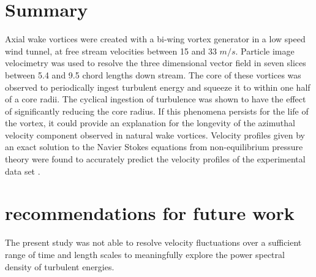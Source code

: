
\section{Summary}

Axial wake vortices were created with a bi-wing vortex generator in a low speed 
wind tunnel, at free stream velocities between 15 and 33 $m/s$. Particle image 
velocimetry was used to resolve the three dimensional vector field in seven 
slices between 5.4 and 9.5 chord lengths down stream. The core of these 
vortices was observed to periodically ingest turbulent energy and squeeze it to 
within one half of a core radii. The cyclical ingestion of turbulence was shown 
to have the effect of significantly reducing the core radius. If this phenomena 
persists for the life of the vortex, it could provide an explanation for the 
longevity of the azimuthal velocity component observed in natural wake vortices.
Velocity profiles given by an exact solution to the Navier Stokes equations 
from non-equilibrium pressure theory were found to accurately predict 
the velocity profiles of the experimental data set \cite{ash2011}.

\section{recommendations for future work}
The present study was not able to resolve velocity fluctuations over a 
sufficient range of time and length scales to meaningfully explore the power 
spectral density of turbulent energies.
